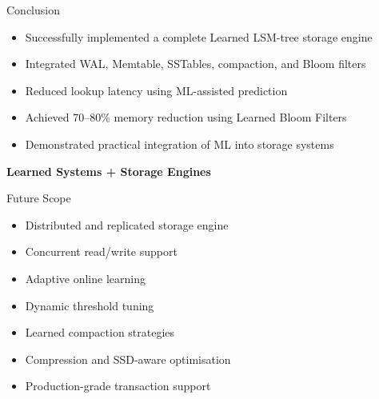 \documentclass[11pt]{beamer}
\begin{document}
\begin{frame}{Conclusion}

\begin{itemize}
    \item Successfully implemented a complete Learned LSM-tree storage engine
    \item Integrated WAL, Memtable, SSTables, compaction, and Bloom filters
    \item Reduced lookup latency using ML-assisted prediction
    \item Achieved 70--80\% memory reduction using Learned Bloom Filters
    \item Demonstrated practical integration of ML into storage systems
\end{itemize}

\vspace{5mm}

\begin{center}

\textbf{\Large Learned Systems + Storage Engines}

\end{center}

\end{frame}

\begin{frame}{Future Scope}

\begin{itemize}
    \item Distributed and replicated storage engine
    \item Concurrent read/write support
    \item Adaptive online learning
    \item Dynamic threshold tuning
    \item Learned compaction strategies
    \item Compression and SSD-aware optimisation
    \item Production-grade transaction support
\end{itemize}

\vspace{5mm}



\end{frame}
\end{document}

